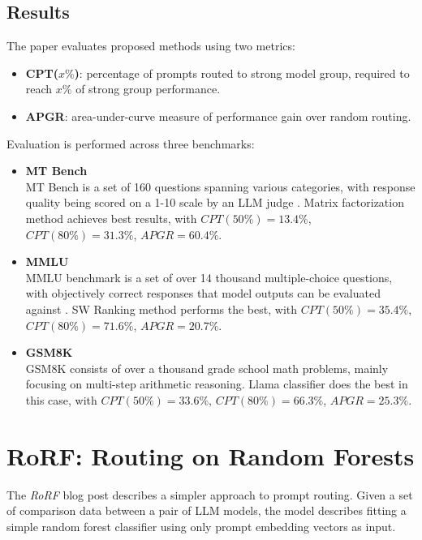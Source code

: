 \documentclass[a4paper,11pt,twoside]{report}
\theoremstyle{definition}
\begin{document}
\subsection{Results}

The paper evaluates proposed methods using two metrics:

\begin{itemize}
    \item \textbf{CPT($x \%$)}: percentage of prompts routed to strong model group, required to reach $x \%$ of strong group performance.
    \item \textbf{APGR}: area-under-curve measure of performance gain over random routing.
\end{itemize}

Evaluation is performed across three benchmarks:

\begin{itemize}
    \item \textbf{MT Bench} \\
    MT Bench is a set of 160 questions spanning various categories, with response quality being scored on a 1-10 scale by an LLM judge \cite{zheng2023mtbench}. Matrix factorization method achieves best results, with $CPT(50 \%) = 13.4 \%$, $CPT(80 \%) = 31.3 \%$, $APGR = 60.4 \%$.
    \item \textbf{MMLU} \\
    MMLU benchmark is a set of over 14 thousand multiple-choice questions, with objectively correct responses that model outputs can be evaluated against \cite{hendrycks2020mmlu}. SW Ranking method performs the best, with $CPT(50 \%) = 35.4 \%$, $CPT(80 \%) = 71.6 \%$, $APGR = 20.7 \%$.
    \item \textbf{GSM8K} \\
    GSM8K consists of over a thousand grade school math problems, mainly focusing on multi-step arithmetic reasoning. Llama classifier does the best in this case, with $CPT(50 \%) = 33.6 \%$, $CPT(80 \%) = 66.3 \%$, $APGR = 25.3 \%$.
\end{itemize}

\section{RoRF: Routing on Random Forests}

The \textit{RoRF} blog post describes a simpler approach to prompt routing. Given a set of comparison data between a pair of LLM models, the model describes fitting a simple random forest classifier using only prompt embedding vectors as input.
\end{document}

